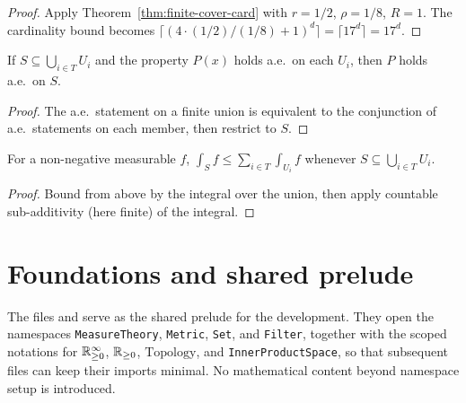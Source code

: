 \begin{proof}
\leanok
{}

Apply Theorem~\ref{thm:finite-cover-card} with $r = 1/2$, $\rho = 1/8$,
$R = 1$. The cardinality bound becomes $\lceil (4\cdot(1/2)/(1/8) + 1)^d
\rceil = \lceil 17^d\rceil = 17^d$.
\end{proof}

\begin{theorem}
\label{thm:ae_on_set_of_ae_on_finite_cover}
\leanok
If $S \subseteq \bigcup_{i \in T} U_i$ and the property $P(x)$ holds a.e.\
on each $U_i$, then $P$ holds a.e.\ on $S$.
\end{theorem}

\begin{proof}
\leanok

The a.e.\ statement on a finite union is equivalent to the conjunction of
a.e.\ statements on each member, then restrict to $S$.
\end{proof}

\begin{theorem}
\label{thm:lintegralOn_le_sum_lintegralOn_of_finite_cover}
\leanok
For a non-negative measurable $f$, $\int_S f \le \sum_{i \in T} \int_{U_i} f$
whenever $S \subseteq \bigcup_{i \in T} U_i$.
\end{theorem}

\begin{proof}
\leanok

Bound from above by the integral over the union, then apply countable
sub-additivity (here finite) of the integral.
\end{proof}

\section{Foundations and shared prelude}

\begin{remark}
The files  and 
serve as the shared prelude for the development. They open the namespaces
\texttt{MeasureTheory}, \texttt{Metric}, \texttt{Set}, and \texttt{Filter},
together with the scoped notations for $\mathbb{R}_{\ge 0}^\infty$, $\mathbb{R}_{\ge 0}$,
$\mathrm{Topology}$, and \texttt{InnerProductSpace}, so that subsequent
files can keep their imports minimal. No mathematical content beyond
namespace setup is introduced.
\end{remark}


